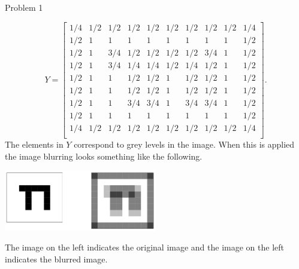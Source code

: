 \begin{problem}{Problem 1}
\begin{Highlight}[Solution]
        \begin{equation}
            Y = 
            \begin{bmatrix}
                1/4 & 1/2 & 1/2 & 1/2 & 1/2 & 1/2 & 1/2 & 1/2 & 1/2 & 1/4 \\
                1/2 & 1 & 1 & 1 & 1 & 1 & 1 & 1 & 1 & 1/2 \\
                1/2 & 1 & 3/4 & 1/2 & 1/2 & 1/2 & 1/2 & 3/4 & 1 & 1/2 \\
                1/2 & 1 & 3/4 & 1/4 & 1/4 & 1/2 & 1/4 & 1/2 & 1 & 1/2 \\
                1/2 & 1 & 1 & 1/2 & 1/2 & 1 & 1/2 & 1/2 & 1 & 1/2 \\
                1/2 & 1 & 1 & 1/2 & 1/2 & 1 & 1/2 & 1/2 & 1 & 1/2 \\
                1/2 & 1 & 1 & 3/4 & 3/4 & 1 & 3/4 & 3/4 & 1 & 1/2 \\
                1/2 & 1 & 1 & 1 & 1 & 1 & 1 & 1 & 1 & 1/2 \\
                1/4 & 1/2 & 1/2 & 1/2 & 1/2 & 1/2 & 1/2 & 1/2 & 1/2 & 1/4 \\
            \end{bmatrix}.
        \end{equation}
        The elements in $Y$ correspond to grey levels in the image. When this is applied the image blurring looks something like the following.

        \begin{center}
            \includegraphics[width = 0.5\textwidth]{Images/Gray Levels.png}
        \end{center}
        The image on the left indicates the original image and the image on the left indicates the blurred image.
    \end{Highlight}
\end{problem}

